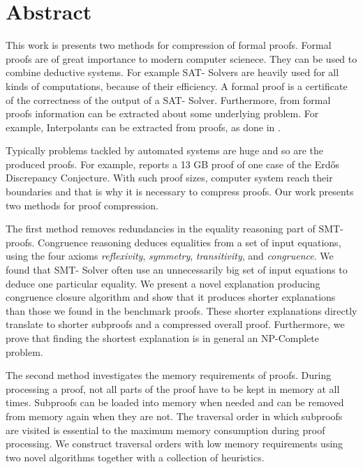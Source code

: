 \chapter*{Abstract}

This work is presents two methods for compression of formal proofs.
Formal proofs are of great importance to modern computer scienece.
They can be used to combine deductive systems.
For example SAT- Solvers \cite{Biere2009} are heavily used for all kinds of computations, because of their efficiency.
A formal proof is a certificate of the correctness of the output of a SAT- Solver.
Furthermore, from formal proofs information can be extracted about some underlying problem.
For example, Interpolants \cite{McMill2005} can be extracted from proofs, as done in \cite{Hofferek2013}.

Typically problems tackled by automated systems are huge and so are the produced proofs.
For example, \cite{Konev2014} reports a 13 GB proof of one case of the Erd\H{o}s Discrepancy Conjecture.
With such proof sizes, computer system reach their boundaries and that is why it is necessary to compress proofs.
Our work presents two methods for proof compression.

The first method removes redundancies in the equality reasoning part of SMT- proofs.
Congruence reasoning deduces equalities from a set of input equations, using the four axioms \emph{reflexivity}, \emph{symmetry}, \emph{transitivity}, and \emph{congruence}.
We found that SMT- Solver often use an unnecessarily big set of input equations to deduce one particular equality.
We present a novel explanation producing congruence closure algorithm and show that it produces shorter explanations than those we found in the benchmark proofs.
These shorter explanations directly translate to shorter subproofs and a compressed overall proof.
Furthermore, we prove that finding the shortest explanation is in general an NP-Complete problem.

The second method investigates the memory requirements of proofs.
During processing a proof, not all parts of the proof have to be kept in memory at all times.
Subproofs can be loaded into memory when needed and can be removed from memory again when they are not.
The traversal order in which subproofs are visited is essential to the maximum memory consumption during proof processing.
We construct traversal orders with low memory requirements using two novel algorithms together with a collection of heuristics. 

